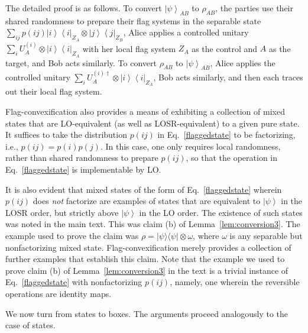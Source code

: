 \documentclass[12pt]{article}
\newcommand{\ket}[1]{\left| #1 \right>}
\newcommand{\bra}[1]{\left< #1 \right|}
\theoremstyle{plain}
\theoremstyle{definition}
\begin{document}
\begin{appendices}
The detailed proof 
 is as follows. 
  To convert $\ket{\psi}_{AB}$ to $\rho_{AB}$, the parties use their shared randomness to prepare their flag systems in the separable state $\sum_{ij} p(ij) \ket{i}\bra{i}_{Z_A} \otimes \ket{j}\bra{j}_{Z_B}$, Alice applies a controlled unitary $\sum_i U_A^{(i)} \otimes \ket{i}\bra{i}_{Z_A}$ with her local flag system $Z_A$ as the control and $A$ 
  as the target, and Bob acts similarly.
To convert $\rho_{AB}$ to $\ket{\psi}_{AB}$, Alice applies the controlled unitary $\sum_i U_A^{(i)\dagger} \otimes \ket{i}\bra{i}_{Z_A}$, 
 Bob acts similarly, and then each traces out their local flag system.

Flag-convexification also provides a means of exhibiting a collection of mixed states that are LO-equivalent (as well as LOSR-equivalent) to a given pure state.  It suffices to take the distribution $p(ij)$ in Eq.~\eqref{flaggedstate} to be factorizing, i.e., $p(ij)= p(i)p(j)$.  In this case, one only requires local randomness, rather than shared randomness to prepare $p(ij)$, so that the operation in Eq.~\eqref{flaggedstate} is implementable by LO.

It is also evident that mixed states of the form of Eq.~\eqref{flaggedstate} wherein $p(ij)$ does {\em not} factorize are examples of states that are equivalent to $\ket{\psi}$ in the LOSR order, but strictly above $\ket{\psi}$ in the LO order.   The existence of such states was noted in the main text.  This was claim (b) of Lemma~\eqref{lem:conversion3}.  The example used to prove the claim was $\rho = |\psi\rangle\langle \psi| \otimes \omega$, where $\omega$ is any separable but nonfactorizing mixed state.  Flag-convexification merely provides a collection of further examples that establish this claim.   Note that the example we used to prove claim (b) of Lemma~\ref{lem:conversion3} in the text is a trivial instance of Eq.~\eqref{flaggedstate} with nonfactorizing $p(ij)$, namely, one wherein the reversible operations are identity maps. 


We now turn from states to boxes.  The arguments proceed analogously to the case of states.


\end{appendices}
\end{document}
